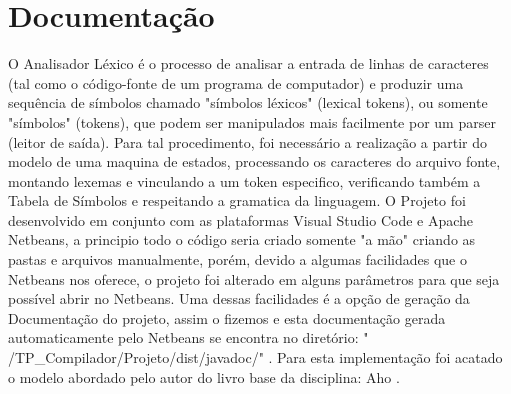 \chapter{Documentação}
O Analisador Léxico é o processo de analisar a entrada de linhas de caracteres (tal como o código-fonte de um programa de computador) e produzir uma sequência de símbolos chamado "símbolos léxicos" (lexical tokens), ou somente "símbolos" (tokens), que podem ser manipulados mais facilmente por um parser (leitor de saída). Para tal procedimento, foi necessário a realização a partir do modelo de uma maquina de estados, processando os caracteres do arquivo fonte, montando lexemas e vinculando a um token especifico, verificando também a Tabela de Símbolos e respeitando a gramatica da linguagem.
O Projeto foi desenvolvido em conjunto com as plataformas Visual Studio Code e Apache Netbeans, a principio todo o código seria criado somente "a mão" criando as pastas e arquivos manualmente, porém, devido a algumas facilidades que o Netbeans nos oferece, o projeto foi alterado em alguns parâmetros para que seja possível abrir no Netbeans.
Uma dessas facilidades é a opção de geração da Documentação do projeto, assim o fizemos e esta documentação gerada automaticamente pelo Netbeans se encontra no diretório: " /TP{\_}Compilador/Projeto/dist/javadoc/" . Para esta implementação foi acatado o modelo abordado pelo autor do livro base da disciplina: Aho .